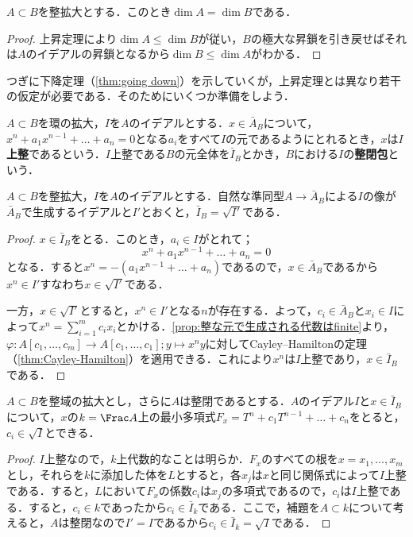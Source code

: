\begin{cor}
	$A\subset B$を整拡大とする．このとき$\dim A=\dim B$である．
\end{cor}

\begin{proof}
	上昇定理により$\dim A\leq\dim B$が従い，$B$の極大な昇鎖を引き戻せばそれは$A$のイデアルの昇鎖となるから$\dim B\leq\dim A$がわかる．
\end{proof}

つぎに下降定理（\ref{thm:going down}）を示していくが，上昇定理とは異なり若干の仮定が必要である．そのためにいくつか準備をしよう．

\begin{defi}
	$A\subset B$を環の拡大，$I$を$A$のイデアルとする．$x\in\bar{A}_B$について，$x^n+a_1x^{n-1}+\dots+a_n=0$となる$a_i$をすべて$I$の元であるようにとれるとき，$x$は$I$\textbf{上整}であるという．$I$上整である$B$の元全体を$\bar{I}_B$とかき，$B$における$I$の\textbf{整閉包}という．
\end{defi}

\begin{lem}\label{lem:イデアルの整閉包と根基}
	$A\subset B$を整拡大，$I$を$A$のイデアルとする．自然な準同型$A\to \bar{A}_B$による$I$の像が$\bar{A}_B$で生成するイデアルと$I'$とおくと，$\bar{I}_B=\sqrt{I'}$である．
\end{lem}

\begin{proof}
	$x\in\bar{I}_B$をとる．このとき，$a_i\in I$がとれて；
	\[x^n+a_1x^{n-1}+\dots+a_n=0\]
	となる．すると$x^n=-(a_1x^{n-1}+\dots+a_n)$であるので，$x\in\bar{A}_B$であるから$x^n\in I'$すなわち$x\in\sqrt{I'}$である．
	
	一方，$x\in\sqrt{I'}$とすると，$x^n\in I'$となる$n$が存在する．よって，$c_i\in\bar{A}_B$と$x_i\in I$によって$x^n=\sum_{i=1}^m c_ix_i$とかける．\ref{prop:整な元で生成される代数はfinite}より，$\varphi:A[c_1,\dots,c_m]\to A[c_1,\dots,c_1];y\mapsto x^ny$に対してCayley--Hamiltonの定理（\ref{thm:Cayley-Hamilton}）を適用できる．これにより$x^n$は$I$上整であり，$x\in\bar{I}_B$である．
\end{proof}

\begin{prop}\label{prop:整なら最小多項式が根基からとれる}
	$A\subset B$を整域の拡大とし，さらに$A$は整閉であるとする．$A$のイデアル$I$と$x\in\bar{I}_B$について，$x$の$k=\Frac A$上の最小多項式$F_x=T^n+c_1T^{n-1}+\dots+c_n$をとると，$c_i\in\sqrt{I}$とできる．
\end{prop}

\begin{proof}
	$I$上整なので，$k$上代数的なことは明らか．$F_x$のすべての根を$x=x_1,\dots,x_m$とし，それらを$k$に添加した体を$L$とすると，各$x_j$は$x$と同じ関係式によって$I$上整である．すると，$L$において$F_x$の係数$c_i$は$x_j$の多項式であるので，$c_i$は$I$上整である．すると，$c_i\in k$であったから$c_i\in\bar{I}_k$である．ここで，補題を$A\subset k$について考えると，$A$は整閉なので$I'=I$であるから$c_i\in\bar{I}_k=\sqrt{I}$である．
\end{proof}

